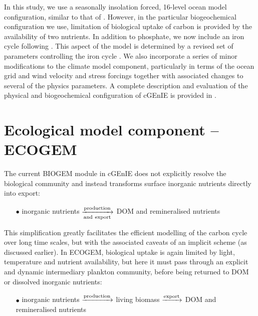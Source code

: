 \documentclass[gmd, manuscript]{copernicus}
\begin{document}
In this study, we use a seasonally insolation forced, 16-level ocean model configuration, similar to that of \citet{Cao:2009}. However, in the particular biogeochemical configuration we use, limitation of biological uptake of carbon is provided by the availability of two nutrients. In addition to phosphate, we now include an iron cycle following \citep{Tagliabue:2016}. This aspect of the model is determined by a revised set of parameters controlling the iron cycle \citep{Ridgwell:prep}. We also incorporate a series of minor modifications to the climate model component, particularly in terms of the  ocean grid and wind velocity and stress forcings \citep[consistent with][]{Marsh:2011} together with associated changes to several of the  physics parameters. A complete description and evaluation of the physical and biogeochemical  configuration of cGEnIE is provided in \citep{Ridgwell:prep}.     

 

%
\section{Ecological model component -- ECOGEM}\label{ECOGEM}

The current BIOGEM module in cGEnIE does not explicitly resolve the biological community and instead transforms surface inorganic nutrients directly into export:

\begin{itemize}
\item[$\bullet$] inorganic nutrients $\xrightarrow[\rm and~export]{\rm production}$ DOM and remineralised nutrients
\end{itemize}

\noindent This simplification greatly facilitates the efficient modelling of the carbon cycle over long time scales, but with the associated  caveats of an implicit scheme (as discussed earlier). In ECOGEM, biological uptake is again limited by light, temperature and nutrient availability, but here it must pass through an explicit and dynamic intermediary plankton community, before being returned to DOM or dissolved inorganic nutrients:


\begin{itemize}
\item[$\bullet$] {inorganic nutrients} $\xrightarrow[]{\rm production}$ {living biomass} $\xrightarrow[]{\rm export}$ {DOM and remineralised nutrients}
\end{itemize}
\end{document}
